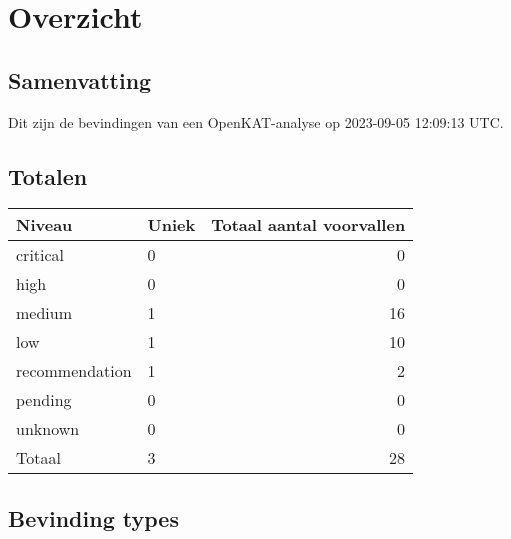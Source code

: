 \documentclass[11pt, a4paper]{report}
\begin{document}
\newpage

\chapter{Overzicht}

\section{Samenvatting}
Dit zijn de bevindingen van een OpenKAT-analyse op 2023-09-05 12:09:13 UTC. %

\bgroup{}
\def\arraystretch{1.2}
\section{Totalen}
\begin{tabular}{ llr }
	Niveau & Uniek & Totaal aantal voorvallen \\\toprule
	\toprule

		\colorbox{box-color-critical}{ \color{color-critical} critical } & 0 & 0 \\

		\colorbox{box-color-high}{ \color{color-high} high } & 0 & 0 \\

		\colorbox{box-color-medium}{ \color{color-medium} medium } & 1 & 16 \\

		\colorbox{box-color-low}{ \color{color-low} low } & 1 & 10 \\

		\colorbox{box-color-recommendation}{ \color{color-recommendation} recommendation } & 1 & 2 \\

		\colorbox{box-color-pending}{ \color{color-pending} pending } & 0 & 0 \\

		\colorbox{box-color-unknown}{ \color{color-unknown} unknown } & 0 & 0 \\

	\bottomrule
	Totaal & 3 & 28
\end{tabular}
\egroup{}

\bgroup{}
\def\arraystretch{1.2}
\section{Bevinding types}
\egroup{}
\end{document}
